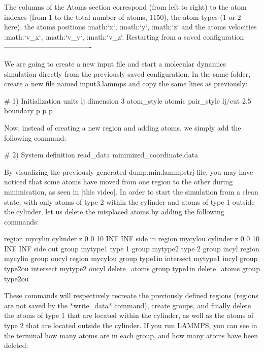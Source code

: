 The columns of the Atoms section
correspond (from left to right) to the atom indexes (from 1
to the total number of atoms, 1150), the atom types (1 or 2
here), the atoms positions :math:`x`, :math:`y`, :math:`z` and the
atoms velocities :math:`v_x`, :math:`v_y`, :math:`v_z`.
Restarting from a saved configuration
-------------------------------------

We are going to create a new input file and start a
molecular dynamics simulation directly from the previously
saved configuration. In the same folder, create a new file
named input3.lammps and copy the same lines as previously:

\begin{lcverbatim}
# 1) Initialization
units lj
dimension 3
atom_style atomic
pair_style lj/cut 2.5
boundary p p p
\end{lcverbatim}

Now, instead of creating a new region and adding atoms, we
simply add the following command:

\begin{lcverbatim}
# 2) System definition
read_data minimized_coordinate.data
\end{lcverbatim}

By visualizing the previously generated dump.min.lammpstrj
file, you may have noticed that some atoms have moved from
one region to the other during minimisation, as seen in
|this video|.
In order to start the simulation from a clean state, with
only atoms of type 2 within the cylinder and atoms of type
1 outside the cylinder, let us delete the misplaced atoms
by adding the following commands:

\begin{lcverbatim}
region mycylin cylinder z 0 0 10 INF INF side in
region mycylou cylinder z 0 0 10 INF INF side out
group mytype1 type 1
group mytype2 type 2
group incyl region mycylin
group oucyl region mycylou
group type1in intersect mytype1 incyl
group type2ou intersect mytype2 oucyl
delete_atoms group type1in
delete_atoms group type2ou
\end{lcverbatim}

These commands will respectively recreate
the previously defined regions (regions are not saved by the
*write_data* command), create groups, and finally delete the
atoms of type 1 that are located within the cylinder, as
well as the atoms of type 2 that are located outside the
cylinder. If you run LAMMPS, you can see in the terminal how
many atoms are in each group, and how many atoms have been
deleted:

